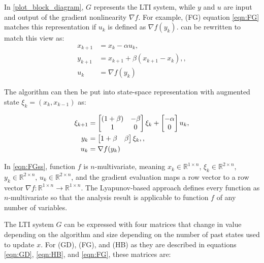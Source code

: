 In \cref{plot_block_diagram}, \(G\) represents the LTI system, while \(y\) and \(u\) are input and output of the gradient nonlinearity $\nabla f$. For example, (FG) equation \eqref{eqn:FG} matches this representation if $u_k$ is defined as $\nabla f(y_k)$.
can be rewritten to match this view as:
\begin{subequations} \label{eqn:FG2}
	\begin{align}
	  x_{k+1}     &=x_k-\alpha u_k \label{eq_FGstate},       \\
	  y_{k+1} &=x_{k+1}+\beta (x_{k+1}-x_k), \label{eq_FGinterpolated point}, \\
	  u_k &= \nabla f(y_k) \label{eq_FGggradient}
	\end{align}
\end{subequations}

The algorithm can then be put into state-space representation with augmented state $\xi _k = (x_k, x_{k-1})$ as:

\begin{subequations} \label{eqn:FGss}
	\begin{align}
	  \xi_{k+1} &= \begin{bmatrix}(1+\beta) & -\beta\\ 1 & 0\end{bmatrix}\xi_k  + \begin{bmatrix}-\alpha\\ 0\end{bmatrix}u_k \label{eq_FGssstate}, \\
	  y_k &= \begin{bmatrix}1+\beta & \beta\end{bmatrix}\xi_k, \label{eq_FGssinterpolation},\\
	  u_k &= \nabla f(y_k) \label{eq_FGssgradient}
	\end{align}
\end{subequations}

In \eqref{eqn:FGss}, function $f$ is $n$-multivariate, meaning  $x_k \in \mathbb{R}^{1\times n}$, $\xi_k \in \mathbb{R}^{2\times n}$, $y_k \in \mathbb{R}^{2\times n}$, $u_k \in \mathbb{R}^{2 \times n}$, and the gradient evaluation maps a row vector to a row vector $\nabla f:\mathbb{R}^{1\times n} \rightarrow \mathbb{R}^{1\times n}$. The Lyapunov-based approach defines every function as $n$-multivariate so that the analysis result is applicable to function $f$ of any number of variables.

The LTI system \(G\) can be expressed with four matrices that change in value depending on the algorithm and size depending on the number of past states used to update \(x\). For (GD), (FG), and (HB) as they are described in equations \eqref{eqn:GD}, \eqref{eqn:HB}, and \eqref{eqn:FG}, these matrices are:

